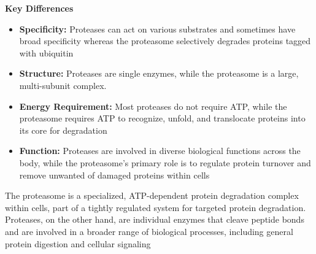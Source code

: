 \documentclass[10pt]{article}
\begin{document}
\textbf{Key Differences}
\begin{itemize}
    \item \textbf{Specificity:} Proteases can act on various substrates and sometimes have broad specificity whereas the proteasome selectively degrades proteins tagged with ubiquitin
    \item \textbf{Structure:} Proteases are single enzymes, while the proteasome is a large, multi-subunit complex.
    \item \textbf{Energy Requirement:} Most proteases do not require ATP, while the proteasome requires ATP to recognize, unfold, and translocate proteins into its core for degradation
    \item \textbf{Function:} Proteases are involved in diverse biological functions across the body, while the proteasome's primary role is to regulate protein turnover and remove unwanted of damaged proteins within cells
\end{itemize}
The proteasome is a specialized, ATP-dependent protein degradation complex within cells, part of a tightly regulated system for targeted protein degradation. Proteases, on the other hand, are individual enzymes that cleave peptide bonds and are involved in a broader range of biological processes, including general protein digestion and cellular signaling
\end{document}
